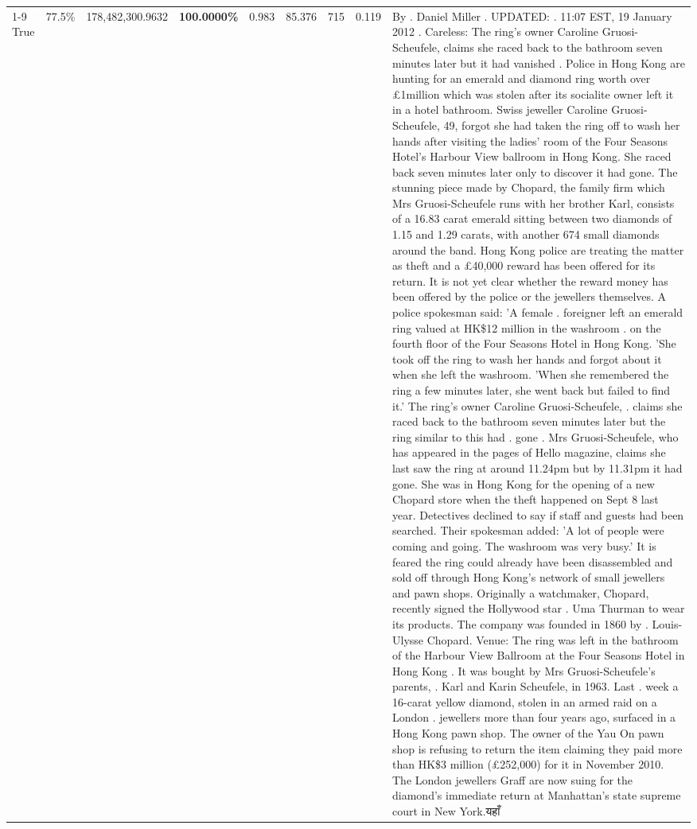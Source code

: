 \begin{table}[H]
\begin{tabular}{lllrlllll}
\cline{1-9} \cline{2-9}
True & 77.5\% & 178,482,300.9632 & \bfseries \color{red} 100.0000\% & 0.983 & 85.376 & 715 & 0.119 & By . Daniel Miller . UPDATED: . 11:07 EST, 19 January 2012 . Careless: The ring's owner Caroline Gruosi-Scheufele, claims she raced back to the bathroom seven minutes later but it had vanished . Police in Hong Kong are hunting for an emerald and diamond ring worth over £1million which was stolen after its socialite owner left it in a hotel bathroom. Swiss jeweller Caroline Gruosi-Scheufele, 49, forgot she had taken the ring off to wash her hands after visiting the ladies' room of the Four Seasons Hotel's Harbour View ballroom in Hong Kong. She raced back seven minutes later only to discover it had gone. The stunning piece made by Chopard, the family firm which Mrs Gruosi-Scheufele runs with her brother Karl, consists of a 16.83 carat emerald sitting between two diamonds of 1.15 and 1.29 carats, with another 674 small diamonds around the band. Hong Kong police are treating the matter as theft and a £40,000 reward has been offered for its return. It is not yet clear whether the reward money has been offered by the police or the jewellers themselves. A police spokesman said: 'A female . foreigner left an emerald ring valued at HK\$12 million in the washroom . on the fourth floor of the Four Seasons Hotel in Hong Kong. 'She took off the ring to wash her hands and forgot about it when she left the washroom. 'When she remembered the ring a few minutes later, she went back but failed to find it.' The ring's owner Caroline Gruosi-Scheufele, . claims she raced back to the bathroom seven minutes later but the ring similar to this had . gone . Mrs Gruosi-Scheufele, who has appeared in the pages of Hello magazine, claims she last saw the ring at around 11.24pm but by 11.31pm it had gone. She was in Hong Kong for the opening of a new Chopard store when the theft happened on Sept 8 last year. Detectives declined to say if staff and guests had been searched. Their spokesman added: 'A lot of people were coming and going. The washroom was very busy.' It is feared the ring could already have been disassembled and sold off through Hong Kong's network of small jewellers and pawn shops. Originally a watchmaker, Chopard, recently signed the Hollywood star . Uma Thurman to wear its products. The company was founded in 1860 by . Louis-Ulysse Chopard. Venue: The ring was left in the bathroom of the Harbour View Ballroom at the Four Seasons Hotel in Hong Kong . It was bought by Mrs Gruosi-Scheufele's  parents, . Karl and Karin Scheufele, in 1963. Last . week a 16-carat yellow diamond, stolen in an armed raid on a London . jewellers more than four years ago, surfaced in a Hong Kong pawn shop. The owner of the Yau On pawn shop is refusing to return the item claiming they paid more than HK\$3 million (£252,000) for it in November 2010. The London jewellers Graff are now suing for the diamond’s immediate return at Manhattan’s state supreme court in New York.यहाँ \\

\end{tabular}
\end{table}
